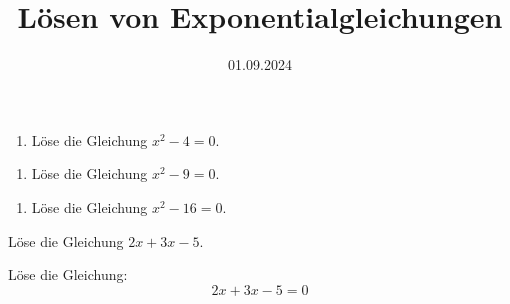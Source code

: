 \documentclass[points=left, 
solution,
textsize=14pt,
mathsize=16pt,
boxoffset=0.67cm
]{exam}
\date{01.09.2024}
\title{Lösen von Exponentialgleichungen}
\begin{document}

\lipsum[1]

\begin{enumerate}[label=\alph*), left=0pt]
    \item Löse die Gleichung \(x^2 - 4 = 0\).
\end{enumerate}


\begin{enumerate}[label=\alph*), resume, left=0pt]
    \item Löse die Gleichung \(x^2 - 9 = 0\).
\end{enumerate}


\begin{enumerate}[label=\alph*), resume, left=0pt]
    \item Löse die Gleichung \(x^2 - 16 = 0\).
\end{enumerate}



\lipsum[1]

Löse die Gleichung \(2x + 3x - 5\).


Löse die Gleichung:
\[
    2x + 3x - 5 = 0
\]
\thinkbubble[Test]


\totalpoints
\end{document}
